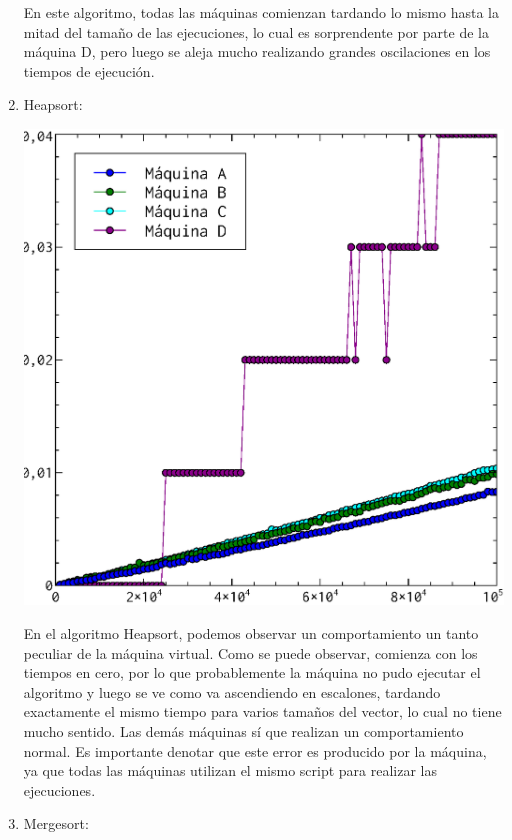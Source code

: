 \documentclass[a4paper, 11pt]{article}
\begin{document}
\begin{enumerate}
\begin{center}
    \end{center}
    En este algoritmo, todas las máquinas comienzan tardando lo mismo hasta la mitad del tamaño de las ejecuciones, lo cual es sorprendente por parte de la máquina D, pero luego se aleja mucho realizando grandes oscilaciones en los tiempos de ejecución.
  \item Heapsort:\\
    \begin{center}
      \includegraphics[scale=0.5]{heapsort_todos.eps}\\
    \end{center}
    En el algoritmo Heapsort, podemos observar un comportamiento un tanto peculiar de la máquina virtual. Como se puede observar, comienza con los tiempos en cero, por lo que probablemente la máquina no pudo ejecutar el algoritmo y luego se ve como va ascendiendo en escalones, tardando exactamente el mismo tiempo para varios tamaños del vector, lo cual no tiene mucho sentido. Las demás máquinas sí que realizan un comportamiento normal. Es importante denotar que este error es producido por la máquina, ya que todas las máquinas utilizan el mismo script para realizar las ejecuciones.
  \item Mergesort:\\
    \begin{center}

\end{center}
\end{enumerate}
\end{document}
